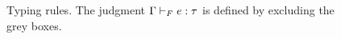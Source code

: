 \begin{figure}
\vspace{-0.00cm}
\caption{Typing rules.
The judgment ${\mathrm{\Gamma}} \vdash_F {e} : {\tau}$ is defined by excluding the grey boxes.}\label{fig:t}\label{fig:typing}
\vspace{-0.00cm}
\end{figure}


